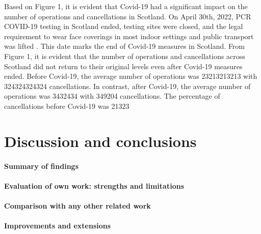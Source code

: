 \documentclass[11pt,a4paper]{article}
\begin{document}
Based on Figure 1, it is evident that Covid-19 had a significant impact on the number of operations and cancellations in Scotland. On April 30th, 2022, PCR COVID-19 testing in Scotland ended, testing sites were closed, and the legal requirement to wear face coverings in most indoor settings and public transport was lifted \cite{williams_bbc_scotland_2023}. This date marks the end of Covid-19 measures in Scotland. From Figure 1, it is evident that the number of operations and cancellations across Scotland did not return to their original levels even after Covid-19 measures ended. Before Covid-19, the average number of operations was 23213213213 with 324324324324 cancellations. In contrast, after Covid-19, the average number of operations was 3432434 with 349204 cancellations. The percentage of cancellations before Covid-19 was 21323%



\section{Discussion and conclusions}

\paragraph{Summary of findings}


\paragraph{Evaluation of own work: strengths and limitations}


\paragraph{Comparison with any other related work}


\paragraph{Improvements and extensions}



\printbibliography
\end{document}
